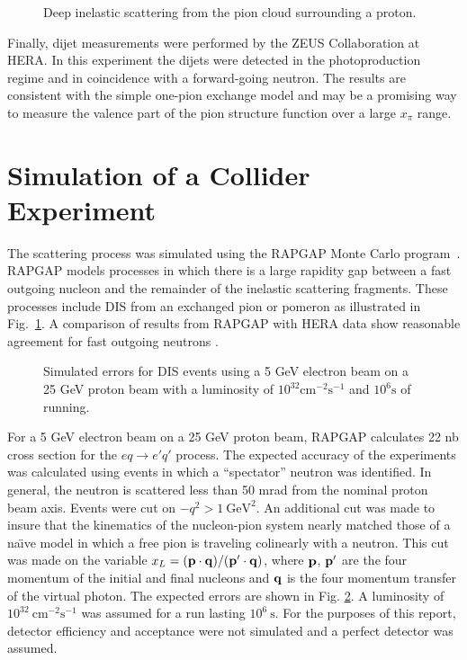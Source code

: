 \begin{figure} %
\centerline{}
\vspace{10pt}

\caption{Deep inelastic scattering from the pion cloud surrounding a 
         proton.}

\label{fig2}
\end{figure}

Finally, dijet measurements\cite{dijet} were performed by the ZEUS
Collaboration at HERA.  In this experiment the dijets were detected in
the photoproduction regime and in coincidence with a forward-going
neutron.  The results are consistent with the simple one-pion exchange
model and may be a promising way to measure the valence part of the
pion structure function over a large $x_\pi$ range.

\section*{Simulation of a Collider Experiment}

The scattering process was simulated using the RAPGAP Monte Carlo
program~\cite{jung}.  RAPGAP models processes in which there is a
large rapidity gap between a fast outgoing nucleon and the remainder
of the inelastic scattering fragments.  These processes include DIS
from an exchanged pion or pomeron as illustrated in Fig.~\ref{fig2}.
A comparison of results from RAPGAP with HERA data show reasonable
agreement for fast outgoing neutrons \cite{adloff}.

\begin{figure}[b] %
\centerline{}
\caption{Simulated errors for DIS events using a 5 GeV electron beam
         on a 25 GeV proton beam with a luminosity of
         $10^{32}\textrm{cm}^{-2}\textrm{s}^{-1}$ and $10^6\textrm{s}$
         of running.}
\label{errors}
\end{figure}

For a 5 GeV electron beam on a 25 GeV proton beam, RAPGAP calculates
22 nb cross section for the $eq\rightarrow e'q'$ process.  The
expected accuracy of the experiments was calculated using events in
which a ``spectator'' neutron was identified.  In general, the neutron
is scattered less than 50 mrad from the nominal proton beam axis.
Events were cut on $-q^2 > 1~\textrm{GeV}^2$.  An additional cut was
made to insure that the kinematics of the nucleon-pion system nearly
matched those of a na\"{\i}ve model in which a free pion is traveling
colinearly with a neutron.  This cut was made on the variable $x_L =
({\bf p}\cdot {\bf q}) / ({\bf p'}\cdot {\bf q})$, where ${\bf p}$,
${\bf p'}$ are the four momentum of the initial and final nucleons and
${\bf q}$ is the four momentum transfer of the virtual photon.  The
expected errors are shown in Fig. \ref{errors}.  A luminosity of
$10^{32}~\textrm{cm}^{-2}\textrm{s}^{-1}$ was assumed for a run
lasting $10^6~\textrm{s}$.  For the purposes of this report, detector
efficiency and acceptance were not simulated and a perfect detector
was assumed.


